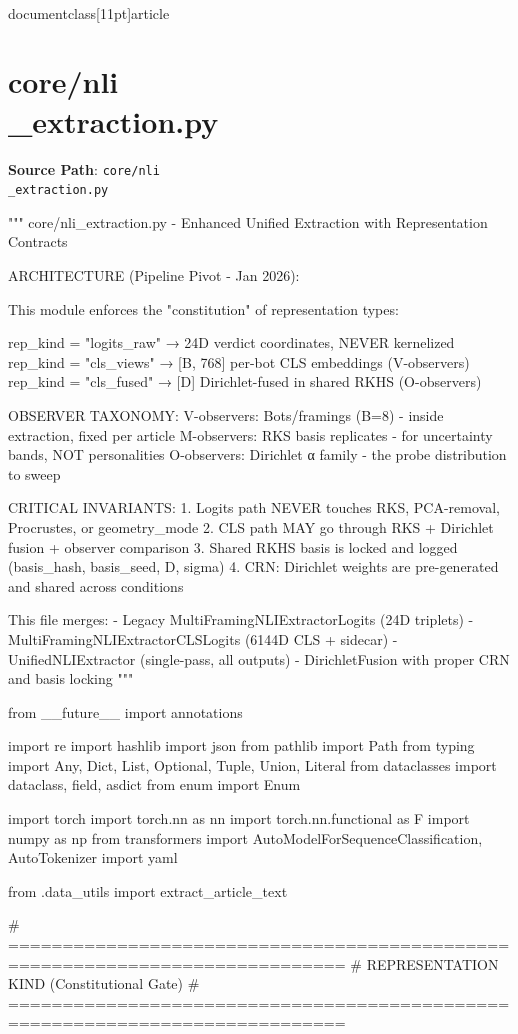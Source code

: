 \\documentclass[11pt]{article}
\begin{document}
\section*{core/nli\\_extraction.py}
\textbf{Source Path}: \texttt{core/nli\\_extraction.py}\par
\bigskip
\begin{CodeBlock}
"""
core/nli_extraction.py - Enhanced Unified Extraction with Representation Contracts

ARCHITECTURE (Pipeline Pivot - Jan 2026):

This module enforces the "constitution" of representation types:

  rep_kind = "logits_raw"   → 24D verdict coordinates, NEVER kernelized
  rep_kind = "cls_views"    → [B, 768] per-bot CLS embeddings (V-observers)
  rep_kind = "cls_fused"    → [D] Dirichlet-fused in shared RKHS (O-observers)

OBSERVER TAXONOMY:
  V-observers: Bots/framings (B=8) - inside extraction, fixed per article
  M-observers: RKS basis replicates - for uncertainty bands, NOT personalities  
  O-observers: Dirichlet α family - the probe distribution to sweep

CRITICAL INVARIANTS:
  1. Logits path NEVER touches RKS, PCA-removal, Procrustes, or geometry_mode
  2. CLS path MAY go through RKS + Dirichlet fusion + observer comparison
  3. Shared RKHS basis is locked and logged (basis_hash, basis_seed, D, sigma)
  4. CRN: Dirichlet weights are pre-generated and shared across conditions

This file merges:
- Legacy MultiFramingNLIExtractorLogits (24D triplets)
- MultiFramingNLIExtractorCLSLogits (6144D CLS + sidecar)
- UnifiedNLIExtractor (single-pass, all outputs)
- DirichletFusion with proper CRN and basis locking
"""

from __future__ import annotations

import re
import hashlib
import json
from pathlib import Path
from typing import Any, Dict, List, Optional, Tuple, Union, Literal
from dataclasses import dataclass, field, asdict
from enum import Enum

import torch
import torch.nn as nn
import torch.nn.functional as F
import numpy as np
from transformers import AutoModelForSequenceClassification, AutoTokenizer
import yaml

from .data_utils import extract_article_text


# =============================================================================
# REPRESENTATION KIND (Constitutional Gate)
# =============================================================================


\end{CodeBlock}
\end{document}
